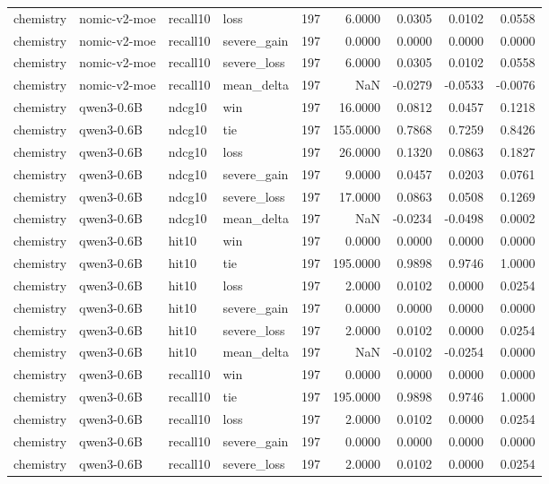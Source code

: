 \begin{tabular}{llllrrrrr}
chemistry & nomic-v2-moe & recall10 & loss & 197 & 6.0000 & 0.0305 & 0.0102 & 0.0558 \\
chemistry & nomic-v2-moe & recall10 & severe\_gain & 197 & 0.0000 & 0.0000 & 0.0000 & 0.0000 \\
chemistry & nomic-v2-moe & recall10 & severe\_loss & 197 & 6.0000 & 0.0305 & 0.0102 & 0.0558 \\
chemistry & nomic-v2-moe & recall10 & mean\_delta & 197 & NaN & -0.0279 & -0.0533 & -0.0076 \\
chemistry & qwen3-0.6B & ndcg10 & win & 197 & 16.0000 & 0.0812 & 0.0457 & 0.1218 \\
chemistry & qwen3-0.6B & ndcg10 & tie & 197 & 155.0000 & 0.7868 & 0.7259 & 0.8426 \\
chemistry & qwen3-0.6B & ndcg10 & loss & 197 & 26.0000 & 0.1320 & 0.0863 & 0.1827 \\
chemistry & qwen3-0.6B & ndcg10 & severe\_gain & 197 & 9.0000 & 0.0457 & 0.0203 & 0.0761 \\
chemistry & qwen3-0.6B & ndcg10 & severe\_loss & 197 & 17.0000 & 0.0863 & 0.0508 & 0.1269 \\
chemistry & qwen3-0.6B & ndcg10 & mean\_delta & 197 & NaN & -0.0234 & -0.0498 & 0.0002 \\
chemistry & qwen3-0.6B & hit10 & win & 197 & 0.0000 & 0.0000 & 0.0000 & 0.0000 \\
chemistry & qwen3-0.6B & hit10 & tie & 197 & 195.0000 & 0.9898 & 0.9746 & 1.0000 \\
chemistry & qwen3-0.6B & hit10 & loss & 197 & 2.0000 & 0.0102 & 0.0000 & 0.0254 \\
chemistry & qwen3-0.6B & hit10 & severe\_gain & 197 & 0.0000 & 0.0000 & 0.0000 & 0.0000 \\
chemistry & qwen3-0.6B & hit10 & severe\_loss & 197 & 2.0000 & 0.0102 & 0.0000 & 0.0254 \\
chemistry & qwen3-0.6B & hit10 & mean\_delta & 197 & NaN & -0.0102 & -0.0254 & 0.0000 \\
chemistry & qwen3-0.6B & recall10 & win & 197 & 0.0000 & 0.0000 & 0.0000 & 0.0000 \\
chemistry & qwen3-0.6B & recall10 & tie & 197 & 195.0000 & 0.9898 & 0.9746 & 1.0000 \\
chemistry & qwen3-0.6B & recall10 & loss & 197 & 2.0000 & 0.0102 & 0.0000 & 0.0254 \\
chemistry & qwen3-0.6B & recall10 & severe\_gain & 197 & 0.0000 & 0.0000 & 0.0000 & 0.0000 \\
chemistry & qwen3-0.6B & recall10 & severe\_loss & 197 & 2.0000 & 0.0102 & 0.0000 & 0.0254 \\

\end{tabular}
